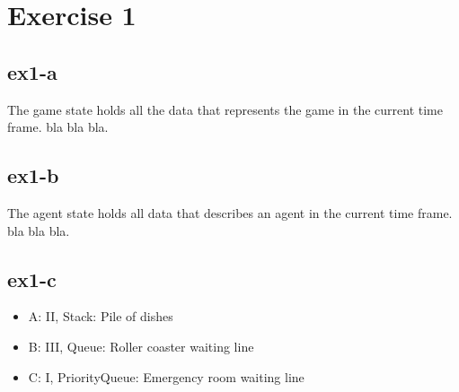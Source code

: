 \section{Exercise 1}
\label{sec:ex1}
\subsection{ex1-a}
The game state holds all the data that represents the game in the current time frame. bla bla bla.
\subsection{ex1-b}
The agent state holds all data that describes an agent in the current time frame. bla bla bla.
\subsection{ex1-c}
\begin{itemize}
\item A: II, Stack: Pile of dishes
\item B: III, Queue: Roller coaster waiting line
\item C: I, PriorityQueue: Emergency room waiting line
\end{itemize}
